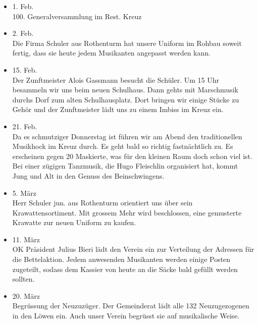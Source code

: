 \begin{history}
\begin{itemize}
        \item 1. Feb.\\
              100. Generalversammlung im Rest. Kreuz

        \item 2. Feb.\\
              Die Firma Schuler aus Rothenturm hat unsere Uniform im Rohbau soweit
              fertig, dass sie heute jedem Musikanten angepasst werden kann.

        \item 15. Feb.\\
              Der Zunftmeister Alois Gassmann besucht die Schüler. Um 15 Uhr besammeln
              wir uns beim neuen Schulhaus. Dann gehts mit Marschmusik durchs Dorf zum
              alten Schulhausplatz. Dort bringen wir einige Stücke zu Gehör und der
              Zunftmeister lädt uns zu einem Imbiss im Kreuz ein.

        \item 21. Feb.\\
              Da es schmutziger Donnerstag ist führen wir am Abend den traditionellen
              Musikhock im Kreuz durch. Es geht bald so richtig fastnächtlich zu. Es
              erscheinen gegen 20 Maskierte, was für den kleinen Raum doch schon viel
              ist. Bei einer zügigen Tanzmusik, die Hugo Fleischlin organisiert hat,
              kommt Jung und Alt in den Genuss des Beinschwingens.

        \item 5. März\\
              Herr Schuler jun. aus Rothenturm orientiert uns über sein
              Krawattensortiment. Mit grossem Mehr wird beschlossen, eine gemusterte
              Krawatte zur neuen Uniform zu kaufen.

        \item 11. März\\
              OK Präsident Julius Bieri lädt den Verein ein zur Verteilung der
              Adressen für die Bettelaktion. Jedem anwesenden Musikanten werden einige
              Posten zugeteilt, sodass dem Kassier von heute an die Säcke bald gefüllt
              werden sollten.

        \item 20. März\\
              Begrüssung der Neuzuzüger. Der Gemeinderat lädt alle 132 Neuzugezogenen
              in den Löwen ein. Auch unser Verein begrüsst sie auf musikalische Weise.


\end{itemize}
\end{history}
